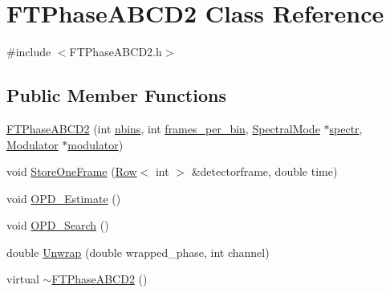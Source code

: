 \hypertarget{classFTPhaseABCD2}{
\section{FTPhaseABCD2 Class Reference}
\label{classFTPhaseABCD2}
}


{\ttfamily \#include $<$FTPhaseABCD2.h$>$}

\subsection*{Public Member Functions}
\begin{DoxyCompactItemize}
\item 
\hyperlink{classFTPhaseABCD2_ad221cbcea6aae7dc1ee5b781c17bba81}{FTPhaseABCD2} (int \hyperlink{classFTPhaseABCD2_acbcfd8097caa8e93a79957b479448202}{nbins}, int \hyperlink{classFTPhaseABCD2_a819bc8d77a0005500876c87b9b08dab3}{frames\_\-per\_\-bin}, \hyperlink{classSpectralMode}{SpectralMode} $\ast$\hyperlink{classFTPhaseABCD2_a67e7dfc25f4d00d204a71361c8a15195}{spectr}, \hyperlink{classModulator}{Modulator} $\ast$\hyperlink{classFTPhaseABCD2_a1755a23fa779636dab93ffb9c9b93e6b}{modulator})
\item 
void \hyperlink{classFTPhaseABCD2_ad4b0d7297334da3cb4454f90fd6cb09f}{StoreOneFrame} (\hyperlink{classRow}{Row}$<$ int $>$ \&detectorframe, double time)
\item 
void \hyperlink{classFTPhaseABCD2_a1f9794309bdfae8ea7c5f57682b89dbf}{OPD\_\-Estimate} ()
\item 
void \hyperlink{classFTPhaseABCD2_a23a931c7735b2c0809d05fb08c3ddf0e}{OPD\_\-Search} ()
\item 
double \hyperlink{classFTPhaseABCD2_a075b8f4137bbfcb352f6c97aa43d96c5}{Unwrap} (double wrapped\_\-phase, int channel)
\item 
virtual \hyperlink{classFTPhaseABCD2_aa873d8d953ee9ae65b02962ee59c3705}{$\sim$FTPhaseABCD2} ()
\end{DoxyCompactItemize}
